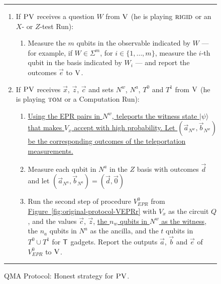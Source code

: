 \documentclass[11pt]{article}
\numberwithin{equation}{section}
\theoremstyle{definition}
\theoremstyle{plain}
\newcommand{\expref}[2]{\hyperref[#2]{#1~\ref{#2}}}
\newcommand{\ket}[1]{|#1\rangle}
\newcommand{\rigid}{\textsc{rigid}}
\newcommand{\tom}{\textsc{tom}}
\newcommand{\ver}{\textsc{V}}
\newcommand{\pv}{\textsc{PV}}
\newcommand{\highlight}[1]{\uline{#1}}
\begin{document}
\begin{figure}[H]
\rule[1ex]{\textwidth}{0.5pt}
\vspace{-20pt}
\begin{enumerate}
  \item If $\pv$ receives a question ${W}$ from $\ver$ (he is playing $\rigid$ or an $X$- or $Z$-test Run):
\begin{enumerate}
     \item[]  Measure the $m$ qubits in the observable indicated by $W$ --- for example, if $W\in \Sigma^m$, for $i\in \{1,\ldots,m\}$, measure the $i$-th qubit in the basis indicated by $W_i$ --- and report the outcomes $\vec{e}$ to $\ver$.
\end{enumerate}

  \item If $\pv$ receives $\vec{x}$, $\vec{z}$, $\vec{c}$ and sets $N^w$, $N^a$, $T^0$ and $T^1$ from $\ver$ (he is playing $\tom$ or a Computation Run):
\begin{enumerate}
  \item[] \highlight{Using the EPR pairs in $N^w$, teleports the witness state
    $\ket{\psi}$ that makes $V_x$ accept with high probability. Let $(\vec{a}_{N^w}, \vec{b}_{N^w})$ be the corresponding
    outcomes of the teleportation measurements.}
  \item[] Measure each qubit in $N^a$ in the $Z$ basis with outcomes $\vec{d}$  and let $(\vec{a}_{N^a},
    \vec{b}_{N^a}) = (\vec{d}, \vec{0} )$ 
	\item[] Run the second step of procedure $V_{EPR}^0$ from
\expref{Figure}{fig:original-protocol-VEPRr} with $V_x$ as the circuit $Q$, and
the
    values $\vec{c}$, $\vec{z}$, \highlight{the $n_w$ qubits in $N^w$ as the witness}, the $n_a$ qubits in 
        $N^a$ as the ancilla, and the $t$ qubits in $T^0\cup T^1$ for $\sf T$ gadgets. Report the outputs  $\vec{a}$, $\vec{b}$ and $\vec{e}$ of $V_{EPR}^0$ to $\ver$.
\end{enumerate}
\end{enumerate}
\rule[2ex]{\textwidth}{0.5pt}\vspace{-.5cm}
\caption{QMA Protocol: Honest strategy for $\pv$.}\label{fig:qma-protocol-PV}
\end{figure}
\end{document}
